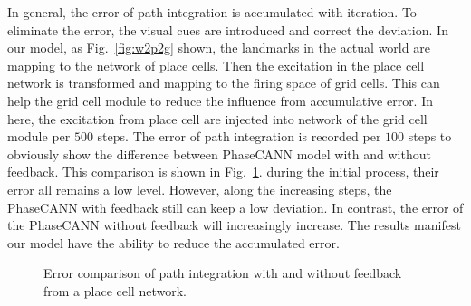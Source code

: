 \documentclass[final,5p,times,twocolumn]{elsarticle}
\begin{document}
In general, the error of path integration is accumulated with iteration. To eliminate the error, the visual cues are introduced and correct the deviation. In our model, as Fig.~\ref{fig:w2p2g} shown, the landmarks in the actual world are mapping to the network of place cells. Then the excitation in the place cell network is transformed and mapping to the firing space of grid cells. This can help the grid cell module to reduce the influence from accumulative error. In here, the excitation from place cell are injected into network of the grid cell module per $500$ steps. The error of path integration is recorded per $100$ steps to obviously show the difference between PhaseCANN model with and without feedback. This comparison is shown in Fig.~\ref{fig:path_integration_feedback}. during the initial process, their error all remains a low level. However, along the increasing steps, the PhaseCANN with feedback still can keep a low deviation. In contrast, the error of the PhaseCANN without feedback will increasingly increase.  The results manifest our model have the ability to reduce the accumulated error.

\begin{figure}[!t]
	\centering
	\caption{Error comparison of path integration with and without feedback from a place cell network.  }
	\label{fig:path_integration_feedback}
\end{figure}
\end{document}
